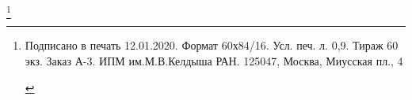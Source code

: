 \documentclass[utf8x]{G7-32} %
\newcommand\blfootnote[1]{%
  \begingroup
  \renewcommand\thefootnote{}\footnote{#1}%
  \addtocounter{footnote}{-1}%
  \endgroup
}
\begin{document}
    
    
    
    
    





\blfootnote{
\begin{centering}
    Подписано в печать 12.01.2020. Формат 60х84/16.  Усл. печ. л. 0,9. Тираж 60 экз. Заказ А-3. ИПМ им.М.В.Келдыша РАН. 125047, Москва, Миусская пл., 4
\end{centering}
}
\end{document}
